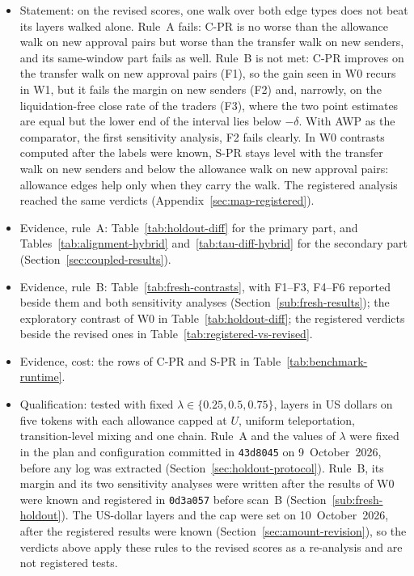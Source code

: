 \begin{itemize}
\item Statement: on the revised scores, one walk over both edge types does not beat its layers walked alone. Rule~A fails: C-PR is no worse than the allowance walk on new approval pairs but worse than the transfer walk on new senders, and its same-window part fails as well. Rule~B is not met: C-PR improves on the transfer walk on new approval pairs (F1), so the gain seen in W0 recurs in W1, but it fails the margin on new senders (F2) and, narrowly, on the liquidation-free close rate of the traders (F3), where the two point estimates are equal but the lower end of the interval lies below $-\delta$. With AWP as the comparator, the first sensitivity analysis, F2 fails clearly. In W0 contrasts computed after the labels were known, S-PR stays level with the transfer walk on new senders and below the allowance walk on new approval pairs: allowance edges help only when they carry the walk. The registered analysis reached the same verdicts (Appendix~\ref{sec:map-registered}).
\item Evidence, rule~A: Table~\ref{tab:holdout-diff} for the primary part, and Tables~\ref{tab:alignment-hybrid} and~\ref{tab:tau-diff-hybrid} for the secondary part (Section~\ref{sec:coupled-results}).
\item Evidence, rule~B: Table~\ref{tab:fresh-contrasts}, with F1--F3, F4--F6 reported beside them and both sensitivity analyses (Section~\ref{sub:fresh-results}); the exploratory contrast of W0 in Table~\ref{tab:holdout-diff}; the registered verdicts beside the revised ones in Table~\ref{tab:registered-vs-revised}.
\item Evidence, cost: the rows of C-PR and S-PR in Table~\ref{tab:benchmark-runtime}.
\item Qualification: tested with fixed $\lambda\in\{0.25,0.5,0.75\}$, layers in US dollars on five tokens with each allowance capped at $U$, uniform teleportation, transition-level mixing and one chain. Rule~A and the values of $\lambda$ were fixed in the plan and configuration committed in \texttt{43d8045} on 9~October~2026, before any log was extracted (Section~\ref{sec:holdout-protocol}). Rule~B, its margin and its two sensitivity analyses were written after the results of W0 were known and registered in \texttt{0d3a057} before scan~B (Section~\ref{sub:fresh-holdout}). The US-dollar layers and the cap were set on 10~October~2026, after the registered results were known (Section~\ref{sec:amount-revision}), so the verdicts above apply these rules to the revised scores as a re-analysis and are not registered tests.
\end{itemize}

